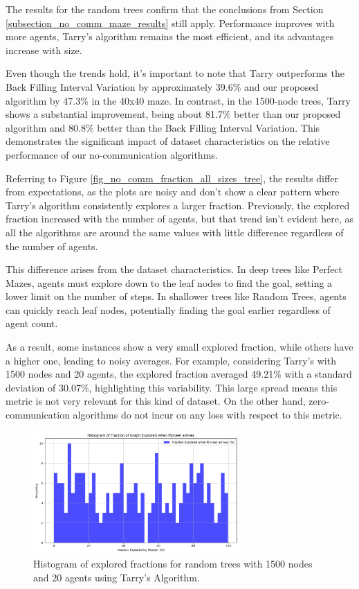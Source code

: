 The results for the random trees confirm that the conclusions from Section \ref{subsection_no_comm_maze_results} still apply. Performance improves with more agents, Tarry's algorithm remains the most efficient, and its advantages increase with size.

Even though the trends hold, it's important to note that Tarry outperforms the Back Filling Interval Variation by approximately 39.6\% and our proposed algorithm by 47.3\% in the 40x40 maze. In contrast, in the 1500-node trees, Tarry shows a substantial improvement, being about 81.7\% better than our proposed algorithm and 80.8\% better than the Back Filling Interval Variation. This demonstrates the significant impact of dataset characteristics on the relative performance of our no-communication algorithms.

Referring to Figure \ref{fig_no_comm_fraction_all_sizes_tree}, the results differ from expectations, as the plots are noisy and don't show a clear pattern where Tarry's algorithm consistently explores a larger fraction. Previously, the explored fraction increased with the number of agents, but that trend isn't evident here, as all the algorithms are around the same values with little difference regardless of the number of agents.

This difference arises from the dataset characteristics. In deep trees like Perfect Mazes, agents must explore down to the leaf nodes to find the goal, setting a lower limit on the number of steps. In shallower trees like Random Trees, agents can quickly reach leaf nodes, potentially finding the goal earlier regardless of agent count.

As a result, some instances show a very small explored fraction, while others have a higher one, leading to noisy averages. For example, considering Tarry's with 1500 nodes and 20 agents, the explored fraction averaged 49.21\% with a standard deviation of 30.07\%, highlighting this variability. This large spread means this metric is not very relevant for this kind of dataset. On the other hand, zero-communication algorithms do not incur on any loss with respect to this metric.

\begin{figure}[H]
    \centering 
    \includegraphics[width=0.7\textwidth]{Cap3/no_comm_fraction_histogram_tree.pdf} 
    \caption{Histogram of explored fractions for random trees with 1500 nodes and 20 agents using Tarry's Algorithm.} 
    \label{fig_no_comm_fraction_histogram_tree}
\end{figure}

